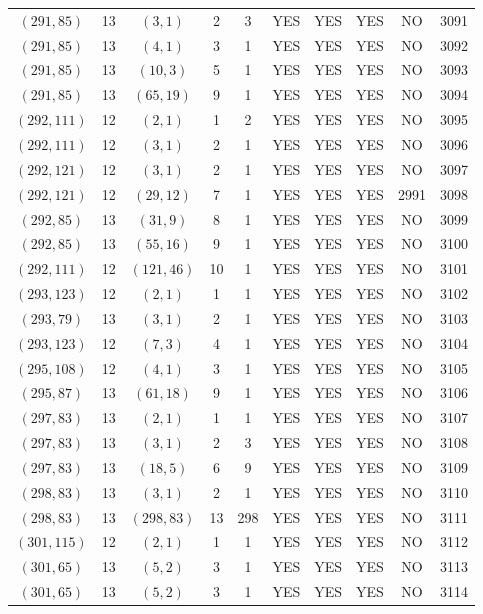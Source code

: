 \begin{longtable}{|c|c|c|c|c|c|c|c|c|c|}
$(291, 85)$ & 13 & $(3, 1)$ & 2 & 3 & YES & YES & YES & NO & 3091\\
$(291, 85)$ & 13 & $(4, 1)$ & 3 & 1 & YES & YES & YES & NO & 3092\\
$(291, 85)$ & 13 & $(10, 3)$ & 5 & 1 & YES & YES & YES & NO & 3093\\
$(291, 85)$ & 13 & $(65, 19)$ & 9 & 1 & YES & YES & YES & NO & 3094\\
$(292, 111)$ & 12 & $(2, 1)$ & 1 & 2 & YES & YES & YES & NO & 3095\\
$(292, 111)$ & 12 & $(3, 1)$ & 2 & 1 & YES & YES & YES & NO & 3096\\
$(292, 121)$ & 12 & $(3, 1)$ & 2 & 1 & YES & YES & YES & NO & 3097\\
$(292, 121)$ & 12 & $(29, 12)$ & 7 & 1 & YES & YES & YES & 2991 & 3098\\
$(292, 85)$ & 13 & $(31, 9)$ & 8 & 1 & YES & YES & YES & NO & 3099\\
$(292, 85)$ & 13 & $(55, 16)$ & 9 & 1 & YES & YES & YES & NO & 3100\\
$(292, 111)$ & 12 & $(121, 46)$ & 10 & 1 & YES & YES & YES & NO & 3101\\
$(293, 123)$ & 12 & $(2, 1)$ & 1 & 1 & YES & YES & YES & NO & 3102\\
$(293, 79)$ & 13 & $(3, 1)$ & 2 & 1 & YES & YES & YES & NO & 3103\\
$(293, 123)$ & 12 & $(7, 3)$ & 4 & 1 & YES & YES & YES & NO & 3104\\
$(295, 108)$ & 12 & $(4, 1)$ & 3 & 1 & YES & YES & YES & NO & 3105\\
$(295, 87)$ & 13 & $(61, 18)$ & 9 & 1 & YES & YES & YES & NO & 3106\\
$(297, 83)$ & 13 & $(2, 1)$ & 1 & 1 & YES & YES & YES & NO & 3107\\
$(297, 83)$ & 13 & $(3, 1)$ & 2 & 3 & YES & YES & YES & NO & 3108\\
$(297, 83)$ & 13 & $(18, 5)$ & 6 & 9 & YES & YES & YES & NO & 3109\\
$(298, 83)$ & 13 & $(3, 1)$ & 2 & 1 & YES & YES & YES & NO & 3110\\
$(298, 83)$ & 13 & $(298, 83)$ & 13 & 298 & YES & YES & YES & NO & 3111\\
$(301, 115)$ & 12 & $(2, 1)$ & 1 & 1 & YES & YES & YES & NO & 3112\\
$(301, 65)$ & 13 & $(5, 2)$ & 3 & 1 & YES & YES & YES & NO & 3113\\
$(301, 65)$ & 13 & $(5, 2)$ & 3 & 1 & YES & YES & YES & NO & 3114\\

\end{longtable}
